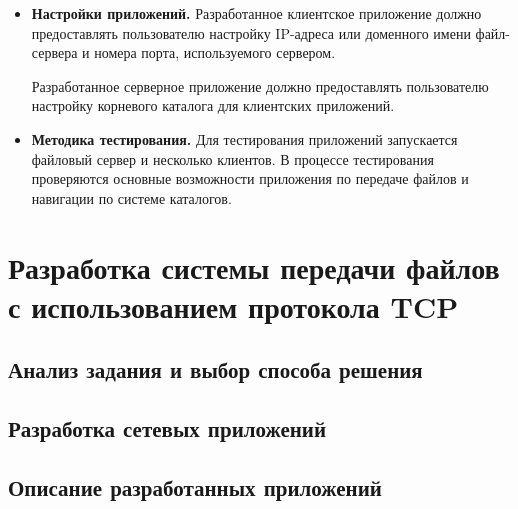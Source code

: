 \begin{itemize}
	\item \textbf{Настройки приложений.} Разработанное клиентское приложение должно предоставлять пользователю настройку IP-адреса или доменного имени файл-сервера и номера порта, используемого сервером.
	
	Разработанное серверное приложение должно предоставлять пользователю настройку корневого каталога для клиентских приложений.

	\item \textbf{Методика тестирования.} Для тестирования приложений запускается файловый сервер и несколько клиентов. В процессе тестирования проверяются основные возможности приложения по передаче файлов и навигации по системе каталогов.

\end{itemize}

\section{Разработка системы передачи файлов с использованием протокола TCP}

\subsection{Анализ задания и выбор способа решения}




\subsection{Разработка сетевых приложений}


\subsection{Описание разработанных приложений}

